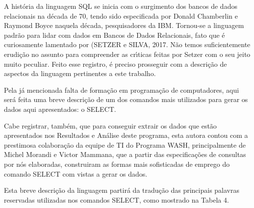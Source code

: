 \documentclass[
12pt,		%
openright,	%
twoside,  %
a4paper,			%
chapter=TITLE,		%
english,			%
french,				%
spanish,			%
brazil				%
]{USPSC-classe/USPSC}
\begin{document}
A hist\'oria da linguagem SQL se inicia com o surgimento dos bancos de dados relacionais na d\'ecada de 70, tendo sido  especificada por Donald Chamberlin e Raymond Boyce naquela d\'ecada, pesquisadores da IBM. Tornou-se a linguagem padr\~ao para lidar com dados em Bancos de Dados Relacionais, fato que \'e curiosamente lamentado por (SETZER e SILVA, 2017. N\~ao temos suficientemente erudi\c{c}\~ao no assunto para compreender as cr\'{\i}ticas feitas por Setzer com o seu jeito muito peculiar. Feito esse registro, \'e preciso prosseguir com a descri\c{c}\~ao de aspectos da linguagem pertinentes a este trabalho.

















Pela j\'a mencionada falta de forma\c{c}\~ao em programa\c{c}\~ao de computadores, aqui ser\'a feita uma breve descri\c{c}\~ao de um dos comandos mais utilizados para gerar os dados aqui apresentados: o SELECT.

















Cabe registrar, tamb\'em, que para conseguir extrair os dados que est\~ao apresentados nos Resultados e An\'alise deste programa, esta autora contou com a prestimosa colabora\c{c}\~ao da equipe de TI do Programa WASH, principalmente de Michel Morandi e Victor Mammana, que a partir das especifica\c{c}\~oes de consultas por n\'os elaboradas, construiram as formas mais sofisticadas de emprego do comando SELECT com vistas a gerar os dados.

















Esta breve descri\c{c}\~ao da linguagem partir\'a da tradu\c{c}\~ao das principais palavras reservadas utilizadas nos comandos SELECT, como mostrado na Tabela 4.
\end{document}
